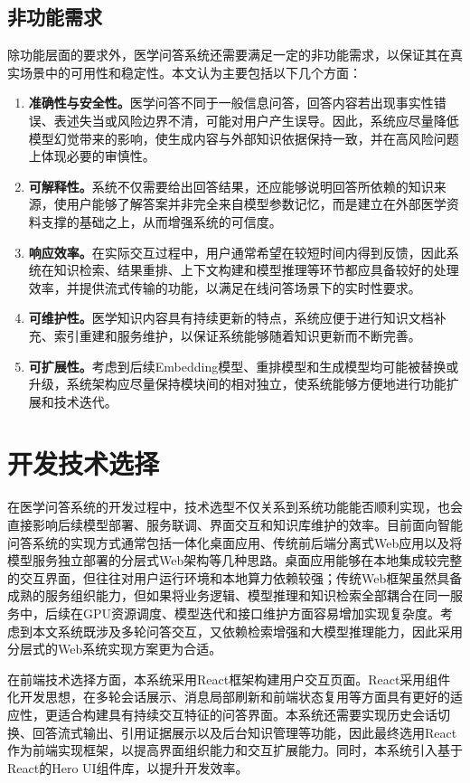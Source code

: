 \subsection{非功能需求}

除功能层面的要求外，医学问答系统还需要满足一定的非功能需求，以保证其在真实场景中的可用性和稳定性。本文认为主要包括以下几个方面：
\begin{enumerate}[label =(\arabic*)]
    \item \textbf{准确性与安全性。}医学问答不同于一般信息问答，回答内容若出现事实性错误、表述失当或风险边界不清，可能对用户产生误导。因此，系统应尽量降低模型幻觉带来的影响，使生成内容与外部知识依据保持一致，并在高风险问题上体现必要的审慎性。
    \item \textbf{可解释性。}系统不仅需要给出回答结果，还应能够说明回答所依赖的知识来源，使用户能够了解答案并非完全来自模型参数记忆，而是建立在外部医学资料支撑的基础之上，从而增强系统的可信度。
    \item \textbf{响应效率。}在实际交互过程中，用户通常希望在较短时间内得到反馈，因此系统在知识检索、结果重排、上下文构建和模型推理等环节都应具备较好的处理效率，并提供流式传输的功能，以满足在线问答场景下的实时性要求。
    \item \textbf{可维护性。}医学知识内容具有持续更新的特点，系统应便于进行知识文档补充、索引重建和服务维护，以保证系统能够随着知识更新而不断完善。
    \item \textbf{可扩展性。}考虑到后续Embedding模型、重排模型和生成模型均可能被替换或升级，系统架构应尽量保持模块间的相对独立，使系统能够方便地进行功能扩展和技术迭代。
\end{enumerate}

\section{开发技术选择}

在医学问答系统的开发过程中，技术选型不仅关系到系统功能能否顺利实现，也会直接影响后续模型部署、服务联调、界面交互和知识库维护的效率。目前面向智能问答系统的实现方式通常包括一体化桌面应用、传统前后端分离式Web应用以及将模型服务独立部署的分层式Web架构等几种思路。桌面应用能够在本地集成较完整的交互界面，但往往对用户运行环境和本地算力依赖较强；传统Web框架虽然具备成熟的服务组织能力，但如果将业务逻辑、模型推理和知识检索全部耦合在同一服务中，后续在GPU资源调度、模型迭代和接口维护方面容易增加实现复杂度。考虑到本文系统既涉及多轮问答交互，又依赖检索增强和大模型推理能力，因此采用分层式的Web系统实现方案更为合适。

在前端技术选择方面，本系统采用React框架构建用户交互页面。React采用组件化开发思想，在多轮会话展示、消息局部刷新和前端状态复用等方面具有更好的适应性，更适合构建具有持续交互特征的问答界面。本系统还需要实现历史会话切换、回答流式输出、引用证据展示以及后台知识管理等功能，因此最终选用React作为前端实现框架，以提高界面组织能力和交互扩展能力。同时，本系统引入基于React的Hero UI组件库，以提升开发效率。

